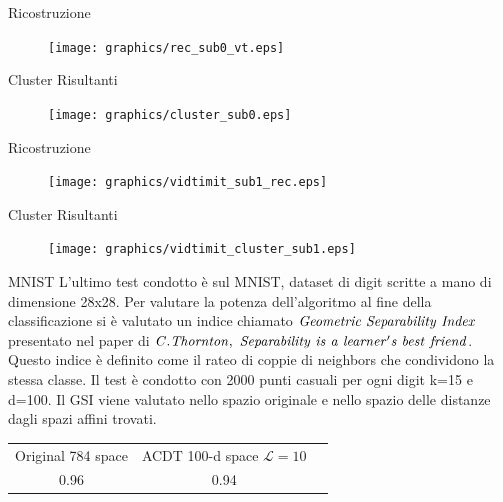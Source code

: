 \documentclass[usenames,dvipsnames,9pt]{beamer}
\theoremstyle{definition}
\begin{document}
\begin{frame}{Ricostruzione}
\begin{figure}[b]
\centering
\texttt{[image: graphics/rec\_sub0\_vt.eps]}
\end{figure}
\end{frame}

\begin{frame}{Cluster Risultanti}
\begin{figure}[b]
\centering
\texttt{[image: graphics/cluster\_sub0.eps]}
\end{figure}
\end{frame}

\begin{frame}{Ricostruzione}
\begin{figure}[b]
\centering
\texttt{[image: graphics/vidtimit\_sub1\_rec.eps]}
\end{figure}
\end{frame}

\begin{frame}{Cluster Risultanti}
\begin{figure}[b]
\centering
\texttt{[image: graphics/vidtimit\_cluster\_sub1.eps]}
\end{figure}
\end{frame}

\begin{frame}{MNIST}
L'ultimo test condotto è sul MNIST, dataset di digit scritte a mano di dimensione 28x28.
Per valutare la potenza dell'algoritmo al fine della classificazione si è valutato un indice chiamato
$\it{Geometric\ Separability\ Index}$ presentato nel paper di $\it{C. Thornton,\ Separability\ is\ a\ learner's\ best\ friend}$.
Questo indice è definito come il rateo di coppie di neighbors che condividono la stessa classe. Il test è condotto con 2000 punti casuali per ogni digit k=15 e d=100.
Il GSI viene valutato nello spazio originale e nello spazio delle distanze dagli spazi affini trovati.
\vskip 0.2in
\begin{center}
    \begin{tabular}{ |c|c|c| }
    \hline
    Original 784 space & ACDT 100-d space $\mathcal{L} = 10$ \\
    0.96 & \color[HTML]{009901} 0.94 \\
    \hline
    \end{tabular}
\end{center}
\end{frame}
\end{document}
